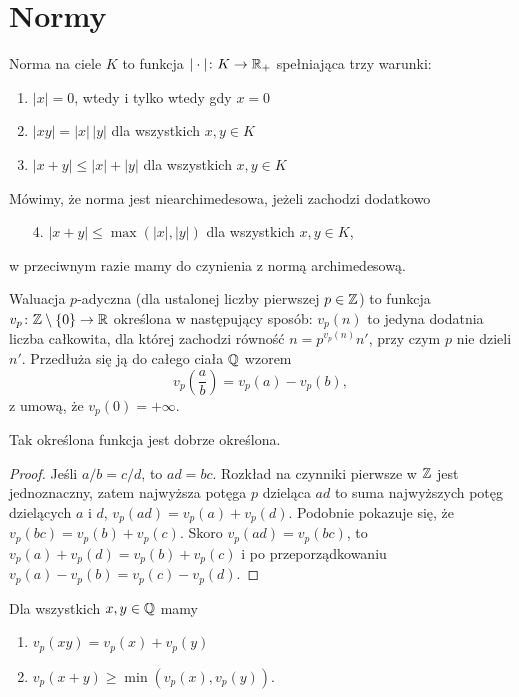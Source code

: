 \section{Normy}
\begin{definicja}
	Norma na ciele $K$ to funkcja $|\cdot| \colon K \to \mathbb{R}_+$ spełniająca trzy warunki:
	\begin{enumerate}
		\item $|x| = 0$, wtedy i tylko wtedy gdy $x = 0$
		\item $|xy| = |x|\, |y|$ dla wszystkich $x, y \in K$
		\item $|x+y| \le |x| + |y|$ dla wszystkich $x, y \in K$
	\end{enumerate}
	Mówimy, że norma jest niearchimedesowa, jeżeli zachodzi dodatkowo
	\begin{enumerate}
		\item [4.] $|x+y| \le \max(|x|,|y|)$ dla wszystkich $x, y \in K$,
	\end{enumerate}
	w przeciwnym razie mamy do czynienia z normą archimedesową.
\end{definicja}

\begin{definicja}
	Waluacja $p$-adyczna (dla ustalonej liczby pierwszej $p \in \mathbb{Z}$) to funkcja $v_p \colon \mathbb{Z} \setminus \{0\} \to \mathbb{R}$ określona w następujący sposób: $v_p(n)$ to jedyna dodatnia liczba całkowita, dla której zachodzi równość $n = p^{v_p(n)} n'$, przy czym $p$ nie dzieli $n'$.
	Przedłuża się ją do całego ciała $\mathbb{Q}$ wzorem
	\[
		v_p\left(\dfrac a b\right) = v_p(a) - v_p(b),
	\]
	z umową, że $v_p(0) = + \infty$.
\end{definicja}

Tak określona funkcja jest dobrze określona.

\begin{proof}
	Jeśli $a / b =c / d$, to $ad = bc$.
	Rozkład na czynniki pierwsze w $\mathbb{Z}$ jest jednoznaczny, zatem najwyższa potęga $p$ dzieląca $ad$ to suma najwyższych potęg dzielących $a$ i $d$, $v_p(ad) = v_p(a) + v_p(d)$.
	Podobnie pokazuje się, że $v_p(bc) = v_p(b) + v_p(c)$.
	Skoro $v_p(ad) = v_p(bc)$, to $v_p(a) + v_p(d) = v_p(b) + v_p(c)$ i po przeporządkowaniu $v_p(a) - v_p(b) = v_p(c) - v_p(d)$.
\end{proof}

\begin{lemat}
	Dla wszystkich $x, y \in \mathbb{Q}$ mamy
	\begin{enumerate}
		\item $v_p(xy) = v_p(x) + v_p(y)$
		\item $v_p(x + y) \ge \min(v_p(x), v_p(y))$.
	\end{enumerate}
\end{lemat}

